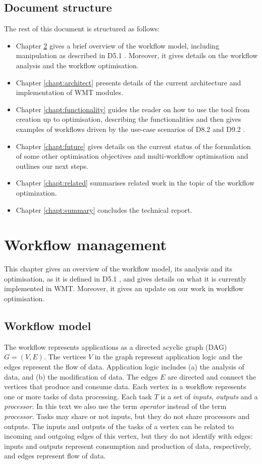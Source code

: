 \documentclass[12pt,openany,onecolumn]{book}
\begin{document}
\section{Document structure}
The rest of this document is structured as follows:
\begin{itemize}
\item Chapter \ref{chapt:theory} gives a brief overview of the workflow model, including manipulation as described in D5.1 \cite{d5.1}. Moreover, it gives details on the workflow analysis and the workflow optimisation.
\item Chapter \ref{chapt:architect} presents details of the current architecture and implementation of WMT modules.
\item Chapter \ref{chapt:functionality} guides the reader on how to use the tool from creation up to optimisation, describing the functionalities and then gives examples of workflows driven by the use-case scenarios of D8.2 \cite{d8.2} and D9.2 \cite{d9.2}.
\item Chapter \ref{chapt:future} gives details on the current status of the formulation of some other optimisation objectives and multi-workflow optimisation and outlines our next steps.
\item Chapter \ref{chapt:related} summarises related work in the topic of the workflow optimization.
\item Chapter \ref{chapt:summary} concludes the technical report.
\end{itemize}

\chapter{Workflow management}\label{chapt:theory}
This chapter gives an overview of the workflow model, its analysis and its optimisation, as it is defined in D5.1 \cite{d5.1}, and gives details on what it is currently implemented in WMT. Moreover, it gives an update on our work in workflow optimisation.

\section{Workflow model}\label{sec:model}
The workflow represents applications as a directed acyclic graph (DAG) $G = (V, E)$. The vertices $V$ in the graph represent application logic and the edges represent the flow of data.
Application logic includes (a) the analysis of data, and (b) the modification of data. The edges $E$ are directed and connect the vertices that produce and consume data.
Each vertex in a workflow represents one or more tasks of data processing. Each task $T$ is a set of \emph{inputs}, \emph{outputs} and a \emph{processor}. In this text we also use the term \emph{operator} instead of the term \emph{processor}.
Tasks may share or not inputs, but they do not share processors and outputs. The inputs and outputs of the tasks of a vertex can be related to incoming and outgoing edges of this vertex, but they do not identify with edges: inputs and outputs represent consumption and production of data, respectively, and edges represent flow of data.
\end{document}
